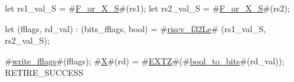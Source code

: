 let rs1_val_S = #\hyperref[sailRISCVzFzyorzyXzyS]{F\_or\_X\_S}#(rs1);
let rs2_val_S = #\hyperref[sailRISCVzFzyorzyXzyS]{F\_or\_X\_S}#(rs2);

let (fflags, rd_val) : (bits_fflags, bool) =
    #\hyperref[sailRISCVzriscvzyf32Le]{riscv\_f32Le}# (rs1_val_S, rs2_val_S);

#\hyperref[sailRISCVzwritezyfflags]{write\_fflags}#(fflags);
#\hyperref[sailRISCVzX]{X}#(rd) = #\hyperref[sailRISCVzEXTZ]{EXTZ}#(#\hyperref[sailRISCVzboolzytozybits]{bool\_to\_bits}#(rd_val));
RETIRE_SUCCESS
